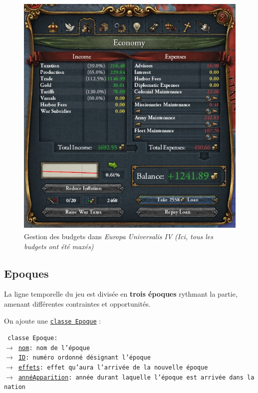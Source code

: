 \documentclass{article}
\newcommand{\ulcolor}[2][class]{\setulcolor{#1}\ul{#2}}
\newcommand{\ulcolor}[2][var]{\setulcolor{#1}\ul{#2}}
\newcommand{\ulcolor}[2][func]{\setulcolor{#1}\ul{#2}}
\newcommand*{\mybox}[2]{\colorbox{#1!30}{\parbox{.98\linewidth}{#2}}}
\newcommand\tab[1][0.5cm]{\hspace*{#1}}
\newcommand{\genbox}[1]{\mybox{verylightgray}{#1}}
\newcommand{\classbox}[1]{\mybox{palegreen}{\texttt{\textcolor{codeColour}{#1}}}}
\newcommand{\class}[1]{\texttt{\textcolor{codeColour}{\ulcolor[class]{#1}}}}
\newcommand{\var}[1]{\texttt{\textcolor{codeColour}{\ulcolor[var]{#1}}}}
\def\reg{\small{\textsuperscript{\textregistered}}}
\begin{document}
                \begin{figure}[h]
                    \centering
                        \includegraphics[scale=0.4]{image_eu4_budgets.jpg}
                        \caption{Gestion des budgets dans \textit{Europa Universalis IV\reg} \textit{(Ici, tous les budgets ont été maxés)}}
                        \label{fig:x photosysteme}
                \end{figure}

        \subsection{Epoques}
            La ligne temporelle du jeu est divisée en \textbf{trois époques} rythmant la partie, amenant différentes contraintes et opportunités. \\

            \tab \genbox{
                    On ajoute une \class{classe Epoque}  : \\
                    \tab \classbox{
                        classe Epoque:\\
                            $\rightarrow$ \var{nom}: nom de l'époque \\
                            $\rightarrow$ \var{ID}: numéro ordonné désignant l'époque \\
                            $\rightarrow$ \var{effets}: effet qu'aura l'arrivée de la nouvelle époque \\
                            $\rightarrow$ \var{ann\'eApparition}: année durant laquelle l'époque est arrivée dans la nation \\
                    } 
                }
            
\end{document}
